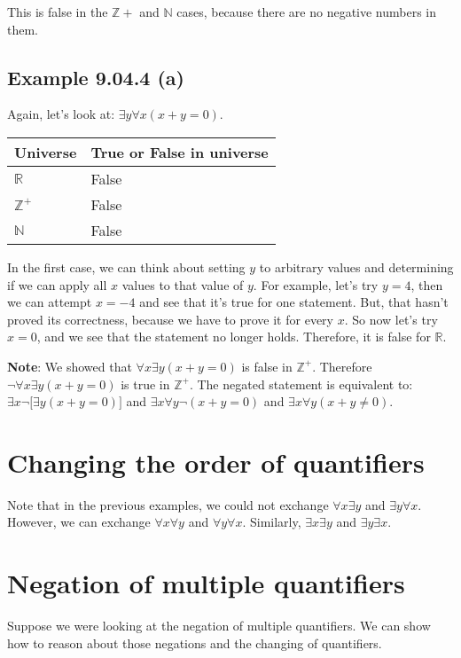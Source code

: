 \documentclass{article}
\begin{document}
This is false in the $\mathbb{Z}+$ and $\mathbb{N}$ cases, because
there are no negative numbers in them.

\subsection*{Example 9.04.4 (a)}

Again, let's look at: $\exists{}y\forall{}x(x+y=0)$.

\begin{tabular}{ll}
Universe & True or False in universe \\
\hline
$\mathbb{R}$ & False \\
$\mathbb{Z}^+$ & False \\
$\mathbb{N}$ & False \\
\end{tabular}

In the first case, we can think about setting $y$ to arbitrary values
and determining if we can apply all $x$ values to that value of
$y$. For example, let's try $y=4$, then we can attempt $x=-4$ and see
that it's true for one statement. But, that hasn't proved its
correctness, because we have to prove it for every $x$. So now let's
try $x=0$, and we see that the statement no longer holds. Therefore,
it is false for $\mathbb{R}$.

\textbf{Note}: We showed that $\forall{}x\exists{}y(x+y=0)$ is false
in $\mathbb{Z}^+$. Therefore $\neg\forall{}x\exists{}y(x+y=0)$ is true
in $\mathbb{Z}^+$. The negated statement is equivalent to:
$\exists{}x\neg\lbrack\exists{}y(x+y=0)\rbrack$ and
$\exists{}x\forall{}y\neg(x+y=0)$ and
$\exists{}x\forall{}y(x+y\neq{}0)$.

\section*{Changing the order of quantifiers}

Note that in the previous examples, we could not exchange
$\forall{}x\exists{}y$ and $\exists{}y\forall{}x$. However, we can
exchange $\forall{}x\forall{}y$ and $\forall{}y\forall{}x$. Similarly,
$\exists{}x\exists{}y$ and $\exists{}y\exists{}x$.

\section*{Negation of multiple quantifiers}

Suppose we were looking at the negation of multiple quantifiers. We
can show how to reason about those negations and the changing of
quantifiers.
\end{document}
